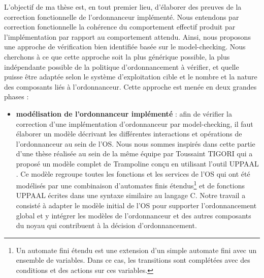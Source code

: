  L'objectif de ma thèse est, en tout premier lieu, d’élaborer des preuves de la correction fonctionnelle de l’ordonnanceur implémenté. Nous entendons par correction fonctionnelle la cohérence du comportement effectif produit par l’implémentation par rapport au comportement attendu. Ainsi, nous proposons une approche de vérification bien identifiée basée sur le model-checking. Nous cherchons à ce que cette approche soit la plus générique possible, la plus indépendante possible de la politique d'ordonnancement à vérifier, et quelle puisse être adaptée selon le système d'exploitation cible et le nombre et la nature des composants liés à l'ordonnanceur. Cette approche est menée en deux grandes phases :
\begin{itemize}
	
	\item \textbf{modélisation de l'ordonnanceur implémenté} : afin de vérifier la correction d'une implémentation d'ordonnanceur par model-checking, il faut élaborer un modèle décrivant les différentes interactions et opérations de l'ordonnanceur au sein de l'OS. Nous nous sommes inspirés dans cette partie d’une thèse réalisée au sein de la même	équipe par Toussaint TIGORI \cite{tigori2015approche} qui a proposé un modèle complet de Trampoline conçu en utilisant l’outil UPPAAL \cite{bengtsson1996uppaal}. Ce modèle regroupe toutes les fonctions et les services de l’OS qui ont été modélisés par une combinaison d’automates finis étendus\footnote{Un automate fini étendu est une extension d’un simple automate fini avec un ensemble de variables. Dans ce cas, les transitions sont complétées avec des conditions et des actions sur ces variables.} et de fonctions UPPAAL écrites dans une syntaxe similaire au langage C.	Notre travail a consisté à adapter le modèle initial de l'OS pour supporter l'ordonnancement global et y intégrer les modèles de l’ordonnanceur et des autres composants du noyau qui contribuent à la décision d'ordonnancement.
	

\end{itemize}

